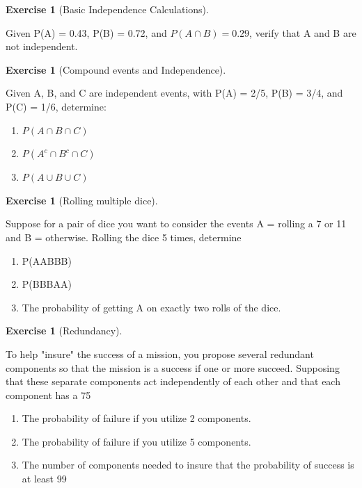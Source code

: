 \documentclass[10pt,]{book}
\theoremstyle{plain}
\theoremstyle{definition}
\theoremstyle{definition}
\theoremstyle{definition}
\newtheorem{exercise}[theorem]{Exercise}
\numberwithin{equation}{section}
\begin{document}
\begin{exercise}[{Basic Independence Calculations}]\label{exercise-25}

	Given P(A) = 0.43, P(B) = 0.72, and \(P(A \cap B) = 0.29\), verify that A and B are not independent.
\end{exercise}
\begin{exercise}[{Compound events and Independence}]\label{exercise-26}

	Given A, B, and C are independent events, with P(A) = 2/5, P(B) = 3/4, and P(C) = 1/6, determine:
	\leavevmode%
\begin{enumerate}
\item\hypertarget{li-147}{}\(P(A \cap B \cap C)\)%
\item\hypertarget{li-148}{}\(P(A^c \cap B^c \cap C)\)%
\item\hypertarget{li-149}{}\(P(A \cup B \cup C)\)%
\end{enumerate}

\end{exercise}
\begin{exercise}[{Rolling multiple dice}]\label{exercise-27}

	Suppose for a pair of dice you want to consider the events A = {rolling a 7 or 11} and B = {otherwise}.  Rolling the dice 5 times, determine
	\leavevmode%
\begin{enumerate}
\item\hypertarget{li-150}{}P(AABBB)%
\item\hypertarget{li-151}{}P(BBBAA)%
\item\hypertarget{li-152}{}The probability of getting A on exactly two rolls of the dice.%
\end{enumerate}

\end{exercise}
\begin{exercise}[{Redundancy}]\label{exercise-28}

	To help "insure" the success of a mission, you propose several redundant components so that the mission is a success if one or more succeed. Supposing that these separate components act independently of each other and that each component has a 75%
	\leavevmode%
\begin{enumerate}
\item\hypertarget{li-153}{}The probability of failure if you utilize 2 components.%
\item\hypertarget{li-154}{}The probability of failure if you utilize 5 components.%
\item\hypertarget{li-155}{}The number of components needed to insure that the probability of success is at least 99%
\end{enumerate}

\end{exercise}
\end{document}
